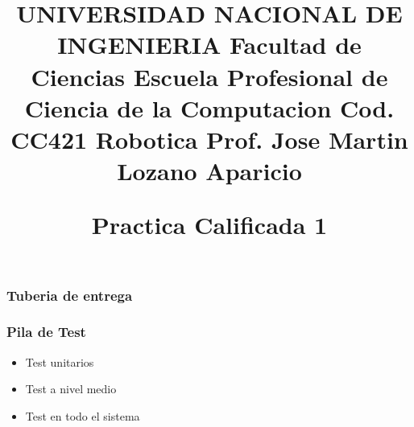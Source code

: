 \documentclass{beamer}
\title{ 
  \fontsize{90}{90} UNIVERSIDAD NACIONAL DE INGENIERIA \linebreak    
    Facultad de Ciencias\linebreak    
    Escuela Profesional de Ciencia de la Computacion\linebreak    
    \small  Cod. CC421 Robotica \linebreak
    \small Prof. Jose Martin Lozano Aparicio\linebreak

{\textbf{\small Practica Calificada 1}} \vspace{-3em}


}
\date{} %
\begin{document}
\begin{frame}
	\frametitle{Tuberia de entrega }
	
\end{frame}
\begin{frame}
	\frametitle{Pila de Test}
	\begin{itemize}
        \item Test unitarios
        \item Test a nivel medio
        \item Test en todo el sistema
    \end{itemize}

\end{frame}
\end{document}
